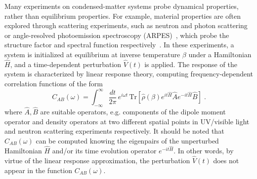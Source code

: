 Many experiments on condensed-matter systems probe dynamical properties, rather than equilibrium properties.
For example, material properties are often explored through scattering experiments, such as neutron and photon scattering or angle-resolved photoemission spectroscopy (ARPES)~\cite{Damascelli_2004}, 
which probe the structure factor and spectral function respectively~\cite{10.1063/1.5114818,2023arXiv231004333W}.
In these experiments, a system is initialized at equilibrium at inverse temperature $\beta$ under a Hamiltonian $\hat{H}$, and a time-dependent perturbation $\hat{V}(t)$ is applied. The response of the system is characterized by linear response theory, computing frequency-dependent correlation functions of the form
\begin{equation}
\label{eq:cabw}
C_{AB}(\omega) = \int_{-\infty}^{\infty} \frac{dt}{2\pi} \, e^{i\omega t} \, \mbox{Tr}[ \hat{\rho}(\beta) e^{it \hat{H}} \hat{A} e^{-it \hat{H}} \hat{B} ] \;.
\end{equation}
where $\hat{A},\hat{B}$ are suitable operators, e.g. components of the dipole moment operator and density operators at two different spatial points in UV/visible light and neutron scattering experiments respectively.
It should be noted that $C_{AB}(\omega)$ can be computed knowing the eigenpairs of the unperturbed Hamiltonian $\hat{H}$ and/or its time evolution operator $e^{-it \hat{H}}$.
In other words, by virtue of the linear response approximation, the perturbation $\hat{V}(t)$ does not appear in the function $C_{AB}(\omega)$.

